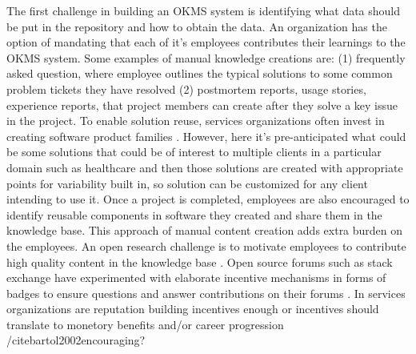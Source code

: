 The first challenge in building an OKMS system is identifying what data should
be put in the repository and how to obtain the data. An organization has the
option of mandating that each of it's employees contributes their learnings to
the OKMS system. Some examples of manual knowledge creations are: (1) frequently
asked question, where employee outlines the typical solutions to some common
problem tickets they have resolved (2) postmortem reports, usage stories,
experience reports\cite{desouza:2005}, that project members can create after
they solve a key issue in the project. To enable solution reuse, services
organizations often invest in creating software product families
\cite{clements2002software}. However, here it's pre-anticipated what could be
some solutions that could be of interest to multiple clients in a particular
domain such as healthcare and then those solutions are created with appropriate
points for variability built in, so solution can be customized for any client
intending to use it.  Once a project is completed, employees are also encouraged
to identify reusable components in software they created and share them in the
knowledge base. This approach of manual content creation adds extra burden on
the employees. An open research challenge is to motivate employees to contribute
high quality content in the knowledge base \cite{hendriks1999share}. Open source
forums such as stack exchange have experimented with elaborate incentive
mechanisms in forms of badges to ensure questions and answer contributions on
their forums \cite{vasilescu2014social}. In services organizations are
reputation building incentives enough or incentives should translate to monetory
benefits and/or career progression /cite{bartol2002encouraging}?

